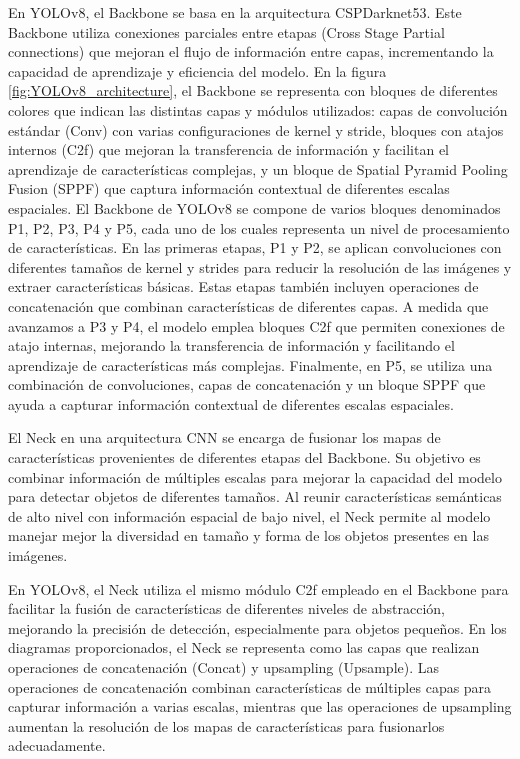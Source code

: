 En YOLOv8, el Backbone se basa en la arquitectura CSPDarknet53. Este Backbone utiliza conexiones parciales entre etapas (Cross Stage Partial connections) que mejoran el flujo de información entre capas, incrementando la capacidad de aprendizaje y eficiencia del modelo. En la figura \ref{fig:YOLOv8_architecture}, el Backbone se representa con bloques de diferentes colores que indican las distintas capas y módulos utilizados: capas de convolución estándar (Conv) con varias configuraciones de kernel y stride, bloques con atajos internos (C2f) que mejoran la transferencia de información y facilitan el aprendizaje de características complejas, y un bloque de Spatial Pyramid Pooling Fusion (SPPF) que captura información contextual de diferentes escalas espaciales. El Backbone de YOLOv8 se compone de varios bloques denominados P1, P2, P3, P4 y P5, cada uno de los cuales representa un nivel de procesamiento de características. En las primeras etapas, P1 y P2, se aplican convoluciones con diferentes tamaños de kernel y strides para reducir la resolución de las imágenes y extraer características básicas. Estas etapas también incluyen operaciones de concatenación que combinan características de diferentes capas. A medida que avanzamos a P3 y P4, el modelo emplea bloques C2f que permiten conexiones de atajo internas, mejorando la transferencia de información y facilitando el aprendizaje de características más complejas. Finalmente, en P5, se utiliza una combinación de convoluciones, capas de concatenación y un bloque SPPF que ayuda a capturar información contextual de diferentes escalas espaciales.

El Neck en una arquitectura CNN se encarga de fusionar los mapas de características provenientes de diferentes etapas del Backbone. Su objetivo es combinar información de múltiples escalas para mejorar la capacidad del modelo para detectar objetos de diferentes tamaños. Al reunir características semánticas de alto nivel con información espacial de bajo nivel, el Neck permite al modelo manejar mejor la diversidad en tamaño y forma de los objetos presentes en las imágenes.

En YOLOv8, el Neck utiliza el mismo módulo C2f empleado en el Backbone para facilitar la fusión de características de diferentes niveles de abstracción, mejorando la precisión de detección, especialmente para objetos pequeños. En los diagramas proporcionados, el Neck se representa como las capas que realizan operaciones de concatenación (Concat) y upsampling (Upsample). Las operaciones de concatenación combinan características de múltiples capas para capturar información a varias escalas, mientras que las operaciones de upsampling aumentan la resolución de los mapas de características para fusionarlos adecuadamente.

